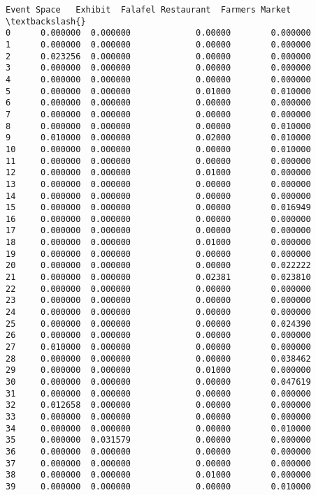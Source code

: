 \documentclass[11pt]{article}
\begin{document}
\begin{tcolorbox}[breakable, size=fbox, boxrule=.5pt, pad at break*=1mm, opacityfill=0]
\begin{Verbatim}[commandchars=\\\{\}]
    Event Space   Exhibit  Falafel Restaurant  Farmers Market  \textbackslash{}
0      0.000000  0.000000             0.00000        0.000000
1      0.000000  0.000000             0.00000        0.000000
2      0.023256  0.000000             0.00000        0.000000
3      0.000000  0.000000             0.00000        0.000000
4      0.000000  0.000000             0.00000        0.000000
5      0.000000  0.000000             0.01000        0.010000
6      0.000000  0.000000             0.00000        0.000000
7      0.000000  0.000000             0.00000        0.000000
8      0.000000  0.000000             0.00000        0.010000
9      0.010000  0.000000             0.02000        0.010000
10     0.000000  0.000000             0.00000        0.010000
11     0.000000  0.000000             0.00000        0.000000
12     0.000000  0.000000             0.01000        0.000000
13     0.000000  0.000000             0.00000        0.000000
14     0.000000  0.000000             0.00000        0.000000
15     0.000000  0.000000             0.00000        0.016949
16     0.000000  0.000000             0.00000        0.000000
17     0.000000  0.000000             0.00000        0.000000
18     0.000000  0.000000             0.01000        0.000000
19     0.000000  0.000000             0.00000        0.000000
20     0.000000  0.000000             0.00000        0.022222
21     0.000000  0.000000             0.02381        0.023810
22     0.000000  0.000000             0.00000        0.000000
23     0.000000  0.000000             0.00000        0.000000
24     0.000000  0.000000             0.00000        0.000000
25     0.000000  0.000000             0.00000        0.024390
26     0.000000  0.000000             0.00000        0.000000
27     0.010000  0.000000             0.00000        0.000000
28     0.000000  0.000000             0.00000        0.038462
29     0.000000  0.000000             0.01000        0.000000
30     0.000000  0.000000             0.00000        0.047619
31     0.000000  0.000000             0.00000        0.000000
32     0.012658  0.000000             0.00000        0.000000
33     0.000000  0.000000             0.00000        0.000000
34     0.000000  0.000000             0.00000        0.010000
35     0.000000  0.031579             0.00000        0.000000
36     0.000000  0.000000             0.00000        0.000000
37     0.000000  0.000000             0.00000        0.000000
38     0.000000  0.000000             0.01000        0.000000
39     0.000000  0.000000             0.00000        0.010000


\end{Verbatim}
\end{tcolorbox}
\end{document}
